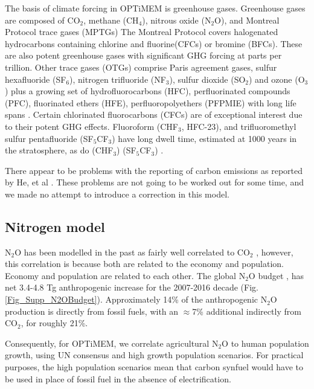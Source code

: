 \documentclass{article}
\begin{document}
 The basis of climate forcing in OPTiMEM is greenhouse gases. Greenhouse gases are composed of CO$_2$, methane (CH$_4$), nitrous oxide (N$_2$O), and Montreal Protocol trace gases (MPTGs) The Montreal Protocol covers halogenated hydrocarbons containing chlorine and fluorine(CFCs) or bromine (BFCs). These are also potent greenhouse gases with significant GHG forcing at parts per trillion.  Other trace gases (OTGs) comprise Paris agreement gases, sulfur hexafluoride (SF$_6$), nitrogen trifluoride (NF$_3$), sulfur dioxide (SO$_2$) and ozone (O$_3$) plus a growing set of hydrofluorocarbons (HFC), perfluorinated compounds (PFC), fluorinated ethers (HFE), perfluoropolyethers (PFPMIE) with long life spans \cite{Hansen2017YoungPeoplesBurden}\cite[table 2.14, p. 212]{Forster2007GHG-changes}. Certain chlorinated fluorocarbons (CFCs) are of exceptional interest due to their potent GHG effects. Fluoroform (CHF$_3$, HFC-23), and trifluoromethyl sulfur pentafluoride (SF$_5$CF$_3$) have long dwell time, estimated at 1000 years in the stratosphere, as do (CHF$_3$) \cite{Oram1998Fluoroform} (SF$_5$CF$_3$) \cite{Sturges2000PotentGHG1000yr}.

 There appear to be problems with  the reporting of carbon emissions as reported by He, et al \cite{He2024MajorGapsPetrochemicalEmissionsReporting}. These problems are not going to be worked out for some time, and we made no attempt to introduce a correction in this model. 

\subsection{Nitrogen model}
\label{Nitrogen_model}
N$_2$O has been modelled in the past as fairly well correlated to CO$_2$ \cite[p. 49, SM2]{Hansen2023WarmingInPipeline}, however, this correlation is because both are related to the economy and population. Economy and population are related to each other. The global N$_2$O budget \cite{Tian2020N2OSources_sinks}, has net 3.4-4.8 Tg anthropogenic increase for the 2007-2016 decade (Fig. \ref{Fig_Supp_N2OBudget}). Approximately 14\% of the anthropogenic N$_2$O production is directly from fossil fuels, with an $\approx$7\% additional indirectly from CO$_2$, for roughly 21\%.

Consequently, for OPTiMEM, we correlate agricultural N$_2$O to human population growth, using UN consensus \cite{UN2022PopGrowth2100} and high growth \cite{UN2004WorldPopTo2300} population scenarios. For practical purposes, the high population scenarios mean that carbon synfuel would have to be used in place of fossil fuel in the absence of electrification.
\end{document}
